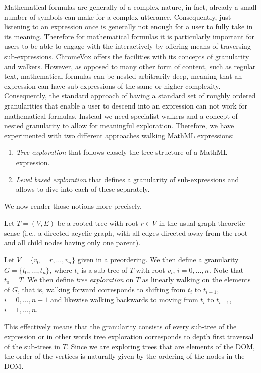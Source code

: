 \documentclass{acm_proc_article-sp}
\begin{document}
Mathematical formulas are generally of a complex nature, in fact, already a
small number of symbols can make for a complex utterance.  Consequently, just
listening to an expression once is generally not enough for a user to fully take
in its meaning.  Therefore for mathematical formulas it is particularly
important for users to be able to engage with the interactively by offering
means of traversing sub-expressions.  ChromeVox offers the facilities with its
concepts of granularity and walkers. However, as opposed to many other form of
content, such as regular text, mathematical formulas can be nested arbitrarily
deep, meaning that an expression can have sub-expressions of the same or higher
complexity. Consequently, the standard approach of having a standard set of
roughly ordered granularities that enable a user to descend into an expression
can not work for mathematical formulas. Instead we need specialist walkers and a
concept of nested granularity to allow for meaningful exploration. Therefore,
we have experimented with two different approaches walking MathML expressions:
\begin{enumerate}[(1)]
\item \emph{Tree exploration} that follows closely the tree structure of a MathML expression.
\item \emph{Level based exploration} that defines a granularity of
  sub-expressions and allows to dive into each of these separately.
\end{enumerate}
We now render those notions more precisely.

Let $T=(V,E)$ be a rooted tree with root $r\in V$ in the usual graph theoretic
sense (i.e., a directed acyclic graph, with all edges directed away from the
root and all child nodes having only one parent). 

Let $V=\{v_0=r,\ldots,v_n\}$ given in a preordering. We then define a
granularity $G=\{t_0,\ldots, t_n\}$, where $t_i$ is a sub-tree of $T$ with root
$v_i$, $i=0,\ldots,n$. Note that $t_0=T$. We then define \emph{tree exploration}
on $T$ as linearly walking on the elements of $G$, that is, walking forward
corresponds to shifting from $t_i$ to $t_{i+1}$, $i=0,\ldots,n-1$ and likewise
walking backwards to moving from $t_i$ to $t_{i-1}$, $i=1,\ldots, n$.

This effectively means that the granularity consists of every sub-tree of the
expression or in other words tree exploration corresponds to depth first
traversal of the sub-trees in $T$. Since we are exploring trees that are
elements of the DOM, the order of the vertices is naturally given by the
ordering of the nodes in the DOM.
\end{document}
